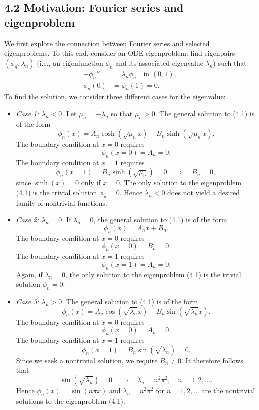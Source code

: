 \subsection{4.2 Motivation: Fourier series and eigenproblem}
We first explore the connection between Fourier series and selected eigenproblems. To this end, consider an ODE eigenproblem: find eigenpairs $(\phi_n, \lambda_n)$ (i.e., an eigenfunction $\phi_n$ and its associated eigenvalue $\lambda_n$) such that
\begin{equation*}
    \begin{aligned}
        -\phi_n'' &= \lambda_n \phi_n \quad \text{in } (0, 1), \\
        \phi_n(0) &= \phi_n(1) = 0.
    \end{aligned} \tag{4.1}
\end{equation*}
To find the solution, we consider three different cases for the eigenvalue:
\begin{itemize}
    \item \textit{Case 1: $\lambda_n < 0$.} Let $\mu_n = -\lambda_n$ so that $\mu_n > 0$. The general solution to (4.1) is of the form
    \[\phi_n(x) = A_n \cosh(\sqrt{\mu_n} x) + B_n \sinh(\sqrt{\mu_n} x).\]
    The boundary condition at $x = 0$ requires
    \[\phi_n(x = 0) = A_n = 0.\]
    The boundary condition at $x = 1$ requires
    \[\phi_n(x = 1) = B_n \sinh(\sqrt{\mu_n}) = 0 \quad \Rightarrow \quad B_n = 0,\]
    since $\sinh(x) = 0$ only if $x = 0$. The only solution to the eigenproblem (4.1) is the trivial solution $\phi_n = 0$. Hence $\lambda_n < 0$ does not yield a desired family of nontrivial functions.
    \item \textit{Case 2: $\lambda_n = 0$.} If $\lambda_n = 0$, the general solution to (4.1) is of the form
    \[\phi_n(x) = A_n x + B_n.\]
    The boundary condition at $x = 0$ requires
    \[\phi_n(x = 0) = B_n = 0.\]
    The boundary condition at $x = 1$ requires
    \[\phi_n(x = 1) = A_n = 0.\]
    Again, if $\lambda_n = 0$, the only solution to the eigenproblem (4.1) is the trivial solution $\phi_n = 0$.
    \item \textit{Case 3: $\lambda_n > 0$.} The general solution to (4.1) is of the form
    \[\phi_n(x) = A_n \cos(\sqrt{\lambda_n} x) + B_n \sin(\sqrt{\lambda_n} x).\]
    The boundary condition at $x = 0$ requires
    \[\phi_n(x = 0) = A_n = 0.\]
    The boundary condition at $x = 1$ requires
    \[\phi_n(x = 1) = B_n \sin(\sqrt{\lambda_n}) = 0.\]
    Since we seek a nontrivial solution, we require $B_n \neq 0$. It therefore follows that
    \[\sin(\sqrt{\lambda_n}) = 0 \quad \Rightarrow \quad \lambda_n = n^2\pi^2, \quad n = 1, 2, \dots.\]
    Hence $\phi_n(x) = \sin(n\pi x)$ and $\lambda_n = n^2\pi^2$ for $n = 1, 2, \dots$ are the nontrivial solutions to the eigenproblem (4.1).
\end{itemize}
